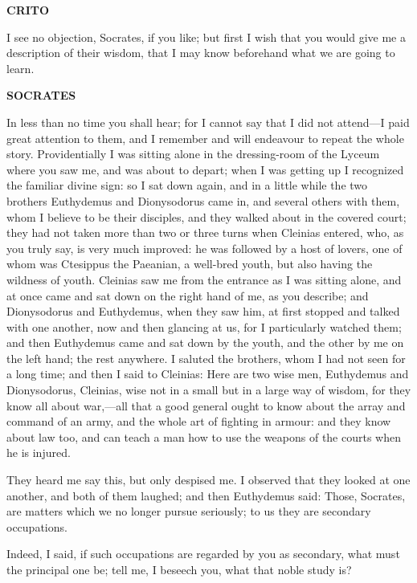 \documentclass[11pt,letter]{article}
\begin{document}
\par \textbf{CRITO}
\par   I see no objection, Socrates, if you like; but first I wish that you would give me a description of their wisdom, that I may know beforehand what we are going to learn.

\par \textbf{SOCRATES}
\par   In less than no time you shall hear; for I cannot say that I did not attend—I paid great attention to them, and I remember and will endeavour to repeat the whole story. Providentially I was sitting alone in the dressing-room of the Lyceum where you saw me, and was about to depart; when I was getting up I recognized the familiar divine sign:  so I sat down again, and in a little while the two brothers Euthydemus and Dionysodorus came in, and several others with them, whom I believe to be their disciples, and they walked about in the covered court; they had not taken more than two or three turns when Cleinias entered, who, as you truly say, is very much improved:  he was followed by a host of lovers, one of whom was Ctesippus the Paeanian, a well-bred youth, but also having the wildness of youth. Cleinias saw me from the entrance as I was sitting alone, and at once came and sat down on the right hand of me, as you describe; and Dionysodorus and Euthydemus, when they saw him, at first stopped and talked with one another, now and then glancing at us, for I particularly watched them; and then Euthydemus came and sat down by the youth, and the other by me on the left hand; the rest anywhere. I saluted the brothers, whom I had not seen for a long time; and then I said to Cleinias:  Here are two wise men, Euthydemus and Dionysodorus, Cleinias, wise not in a small but in a large way of wisdom, for they know all about war,—all that a good general ought to know about the array and command of an army, and the whole art of fighting in armour:  and they know about law too, and can teach a man how to use the weapons of the courts when he is injured.

\par  They heard me say this, but only despised me. I observed that they looked at one another, and both of them laughed; and then Euthydemus said: Those, Socrates, are matters which we no longer pursue seriously; to us they are secondary occupations.

\par  Indeed, I said, if such occupations are regarded by you as secondary, what must the principal one be; tell me, I beseech you, what that noble study is?
\end{document}
